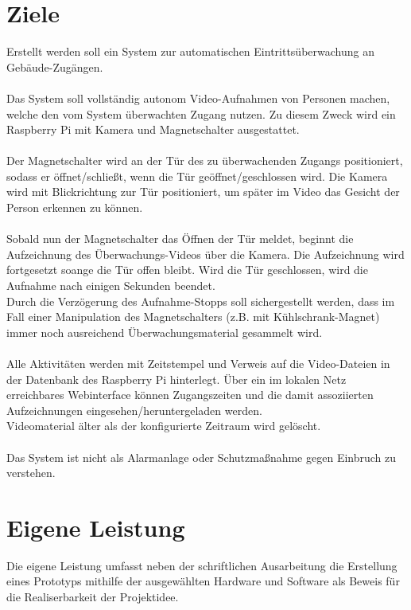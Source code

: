 \section{Ziele}
Erstellt werden soll ein System zur automatischen Eintritts\"uberwachung an Geb\"aude-Zug\"angen.\\
\\
Das System soll vollst\"andig autonom Video-Aufnahmen von Personen machen, welche den vom System \"uberwachten Zugang nutzen.
Zu diesem Zweck wird ein Raspberry Pi mit Kamera und Magnetschalter ausgestattet. \\
\\
Der Magnetschalter wird an der T\"ur des zu \"uberwachenden Zugangs positioniert, sodass  er \"offnet/schlie{\ss}t, wenn die T\"ur ge\"offnet/geschlossen wird.
Die Kamera wird mit Blickrichtung zur T\"ur positioniert, um sp\"ater im Video das Gesicht der Person erkennen zu k\"onnen.\\
\\
Sobald nun der Magnetschalter das \"Offnen der T\"ur meldet, beginnt die Aufzeichnung des \"Uberwachungs-Videos \"uber die Kamera. Die Aufzeichnung wird fortgesetzt soange die T\"ur offen bleibt. Wird die T\"ur geschlossen, wird die Aufnahme nach einigen Sekunden beendet.\\
Durch die Verz\"ogerung des Aufnahme-Stopps soll sichergestellt werden, dass im Fall einer Manipulation des Magnetschalters (z.B. mit K\"uhlschrank-Magnet) immer noch ausreichend \"Uberwachungsmaterial gesammelt wird.\\
\\
Alle Aktivit\"aten werden mit Zeitstempel und Verweis auf die Video-Dateien in der Datenbank des Raspberry Pi hinterlegt.
\"Uber ein im lokalen Netz erreichbares Webinterface k\"onnen Zugangszeiten und die damit assoziierten Aufzeichnungen eingesehen/heruntergeladen werden.\\
Videomaterial \"alter als der konfigurierte Zeitraum wird gel\"oscht.\\
\\
Das System ist nicht als Alarmanlage oder Schutzma{\ss}nahme gegen Einbruch zu verstehen.
\\

\section{Eigene Leistung}
Die eigene Leistung umfasst neben der schriftlichen Ausarbeitung die Erstellung eines Prototyps mithilfe der ausgew\"ahlten Hardware und Software als Beweis f\"ur die Realiserbarkeit der Projektidee.


